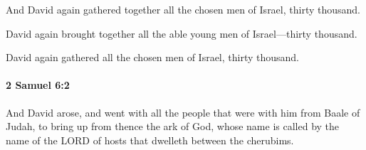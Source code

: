 			\begin{versebox}
					\item[BHS] 
					\item[ASV] And David again gathered together all the chosen men of Israel, thirty thousand.
					\item[NIV] David again brought together all the able young men of Israel—thirty thousand.
					\item[NRSV] David again gathered all the chosen men of Israel, thirty thousand.
			\end{versebox}

		\paragraph{2 Samuel 6:2} %
			\label{2SAMUEL-6-2}

			And David arose, and went with all the people that were with him from Baale of Judah, to bring up from thence the ark of God, whose name is called by the name of the LORD of hosts that dwelleth between the cherubims.

